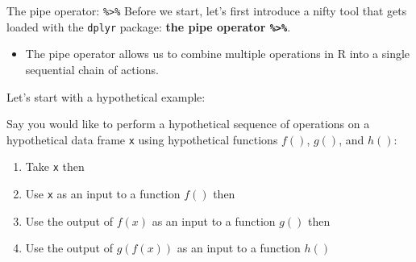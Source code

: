 \documentclass[
  ignorenonframetext,
]{beamer}
\providecommand{\tightlist}{%
  \setlength{\itemsep}{0pt}\setlength{\parskip}{0pt}}
\begin{document}
\begin{frame}[fragile]{The pipe operator: \texttt{\%\textgreater{}\%}}
\protect\hypertarget{the-pipe-operator}{}
Before we start, let's first introduce a nifty tool that gets loaded
with the \texttt{dplyr} package: \textbf{the pipe operator
\texttt{\%\textgreater{}\%}}.

\begin{itemize}
\tightlist
\item
  The pipe operator allows us to combine multiple operations in R into a
  single sequential chain of actions.
\end{itemize}

Let's start with a hypothetical example:

Say you would like to perform a hypothetical sequence of operations on a
hypothetical data frame \texttt{x} using hypothetical functions \(f()\),
\(g()\), and \(h()\):

\begin{enumerate}
\tightlist
\item
  Take \texttt{x} then
\item
  Use \texttt{x} as an input to a function \(f()\) then
\item
  Use the output of \(f(x)\) as an input to a function \(g()\) then
\item
  Use the output of \(g(f(x))\) as an input to a function \(h()\)
\end{enumerate}
\end{frame}
\end{document}
